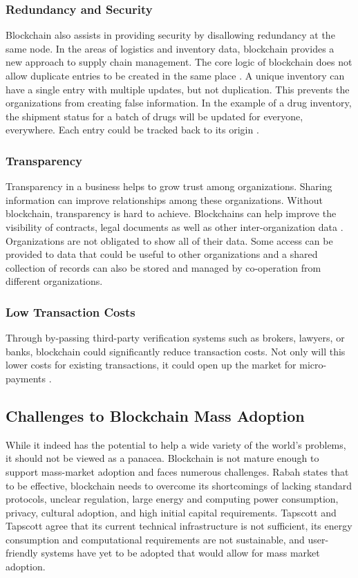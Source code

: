 \documentclass[sigconf]{acmart}
\begin{document}
\subsubsection{Redundancy and Security} Blockchain also assists in providing security by disallowing redundancy at the same node. In the areas of logistics and inventory data, blockchain provides a new approach to supply chain management. The core logic of blockchain does not allow duplicate entries to be created in the same place \cite{arbc4}. A unique inventory can have a single entry with multiple updates, but not duplication. This prevents the organizations from creating false information. In the example of a drug inventory, the shipment status for a batch of drugs will be updated for everyone, everywhere. Each entry could be tracked back to its origin \cite{arbc4}. 

\subsubsection{Transparency} Transparency in a business helps to grow trust among organizations. Sharing information can improve relationships among these organizations. Without blockchain, transparency is hard to achieve. Blockchains can help improve the visibility of contracts, legal documents as well as other inter-organization data \cite{pabc1}. Organizations are not obligated to show all of their data. Some access can be provided to data that could be useful to other organizations and a shared collection of records can also be stored and managed by co-operation from different organizations.

\subsubsection{Low Transaction Costs} Through by-passing third-party verification systems such as brokers, lawyers, or banks, blockchain could significantly reduce transaction costs. Not only will this lower costs for existing transactions, it could open up the market for micro-payments \cite{hbr}. 

\subsection{Challenges to Blockchain Mass Adoption}
While it indeed has the potential to help a wide variety of the world's problems, it should not be viewed as a panacea.  Blockchain is not mature enough to support mass-market adoption and faces numerous challenges. Rabah \cite{rabah2017overview} states that to be effective, blockchain needs to overcome its shortcomings of lacking standard protocols, unclear regulation, large energy and computing power consumption, privacy, cultural adoption, and high initial capital requirements. Tapscott and Tapscott \cite{tapscott} agree that its current technical infrastructure is not sufficient, its energy consumption and computational requirements are not sustainable, and user-friendly systems have yet to be adopted that would allow for mass market adoption.
\end{document}
